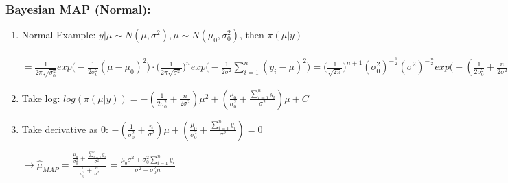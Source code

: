 \documentclass{beamer}
\begin{document}

\begin{frame}
\frametitle{Bayesian MAP (Normal):}

\begin{enumerate}
\item Normal Example: $y|\mu \sim N(\mu, \sigma^2), \mu \sim N(\mu_0, \sigma_0^2)$, then $\pi(\mu|y)$

$= \frac{1}{2\pi\sqrt{\sigma_0^2}}exp\Big(-\frac{1}{2\sigma_0^2}(\mu-\mu_0)^2\Big) \cdot \Big(\frac{1}{2\pi\sqrt{\sigma^2}}\Big)^n exp\Big(-\frac{1}{2\sigma^2} \sum_{i=1}^n (y_i - \mu)^2\Big) = \Big(\frac{1}{\sqrt{2\pi}}\Big)^{n+1} (\sigma_0^2)^{-\frac{1}{2}} (\sigma^2)^{-\frac{n}{2}} exp \Big(-(\frac{1}{2\sigma^2_0} + \frac{n}{2\sigma^2}) \mu^2 + (\frac{\mu_0}{\sigma_0^2} + \frac{\sum_{i=1}^n y_i}{\sigma^2})\mu  - (\frac{\mu_0}{2\sigma_0^2} + \frac{\sum_{i=1}^n x_i^2}{2\sigma^2}\Big) \sim N\Big(\frac{\frac{\mu_0}{\sigma_0^2} + \frac{\sum_{i=1}^n y_i}{\sigma^2}}{\frac{1}{\sigma^2_0} + \frac{n}{\sigma^2}}, \frac{1}{\frac{1}{\sigma^2_0} + \frac{n}{\sigma^2}}\Big)$


\item Take log: $log(\pi(\mu|y)) = -(\frac{1}{2\sigma^2_0} + \frac{n}{2\sigma^2}) \mu^2 + (\frac{\mu_0}{\sigma_0^2} + \frac{\sum_{i=1}^n y_i}{\sigma^2})\mu + C$

\item Take derivative as 0: $-(\frac{1}{\sigma^2_0} + \frac{n}{\sigma^2})\mu + (\frac{\mu_0}{\sigma_0^2} + \frac{\sum_{i=1}^n y_i}{\sigma^2}) = 0$ 

$\rightarrow \hat \mu_{MAP} = \frac{\frac{\mu_0}{\sigma_0^2} + \frac{\sum_{i=1}^n y_i}{\sigma^2}}{\frac{1}{\sigma^2_0} + \frac{n}{\sigma^2}} = \frac{\mu_0 \sigma^2 + \sigma_0^2 \sum_{i=1}^n y_i}{\sigma^2 + \sigma_0^2 n}$


\end{enumerate}

\end{frame}

\end{document}
